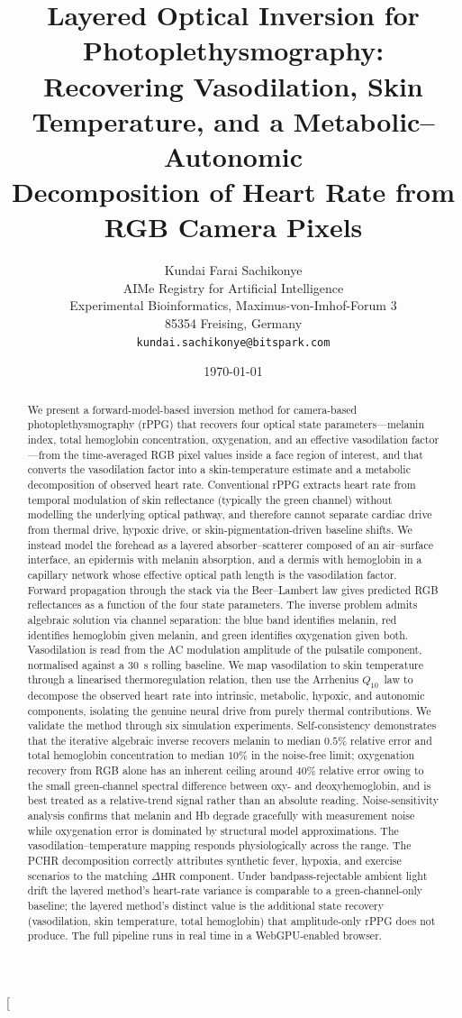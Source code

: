 \documentclass[10pt,twocolumn,a4paper]{article}
\title{\textbf{Layered Optical Inversion for Photoplethysmography:\\
Recovering Vasodilation, Skin Temperature, and a Metabolic--Autonomic\\
Decomposition of Heart Rate from RGB Camera Pixels}\\[0.3em]}
\author{
Kundai Farai Sachikonye\\[0.3em]
AIMe Registry for Artificial Intelligence\\
Experimental Bioinformatics, Maximus-von-Imhof-Forum 3\\
85354 Freising, Germany\\
\texttt{kundai.sachikonye@bitspark.com}
}
\date{\today}
\theoremstyle{definition}
\newcommand{\Qten}{Q_{10}}
\begin{document}
\twocolumn[
\begin{@twocolumnfalse}
\maketitle
\begin{abstract}
\noindent
We present a forward-model-based inversion method for camera-based
photoplethysmography (rPPG) that recovers four optical state
parameters---melanin index, total hemoglobin concentration, oxygenation,
and an effective vasodilation factor---from the time-averaged RGB pixel
values inside a face region of interest, and that converts the
vasodilation factor into a skin-temperature estimate and a metabolic
decomposition of observed heart rate. Conventional rPPG extracts
heart rate from temporal modulation of skin reflectance (typically the
green channel) without modelling the underlying optical pathway, and
therefore cannot separate cardiac drive from thermal drive, hypoxic
drive, or skin-pigmentation-driven baseline shifts. We instead model
the forehead as a layered absorber--scatterer composed of an
air--surface interface, an epidermis with melanin absorption, and a
dermis with hemoglobin in a capillary network whose effective optical
path length is the vasodilation factor. Forward propagation through
the stack via the Beer--Lambert law gives predicted RGB reflectances as
a function of the four state parameters. The inverse problem admits
algebraic solution via channel separation: the blue band identifies
melanin, red identifies hemoglobin given melanin, and green identifies
oxygenation given both. Vasodilation is read from the AC modulation
amplitude of the pulsatile component, normalised against a 30~s
rolling baseline. We map vasodilation to skin temperature through a
linearised thermoregulation relation, then use the Arrhenius
$\Qten$~law to decompose the observed heart rate into intrinsic,
metabolic, hypoxic, and autonomic components, isolating the genuine
neural drive from purely thermal contributions. We validate the method
through six simulation experiments. Self-consistency demonstrates
that the iterative algebraic inverse recovers melanin to median
$0.5\%$ relative error and total hemoglobin concentration to
median $10\%$ in the noise-free limit; oxygenation recovery from
RGB alone has an inherent ceiling around $40\%$ relative error owing
to the small green-channel spectral difference between oxy- and
deoxyhemoglobin, and is best treated as a relative-trend signal
rather than an absolute reading. Noise-sensitivity analysis confirms
that melanin and Hb degrade gracefully with measurement noise while
oxygenation error is dominated by structural model approximations.
The vasodilation--temperature mapping responds physiologically across
the range. The PCHR decomposition correctly attributes synthetic
fever, hypoxia, and exercise scenarios to the matching
$\Delta\mathrm{HR}$ component. Under bandpass-rejectable ambient
light drift the layered method's heart-rate variance is comparable
to a green-channel-only baseline; the layered method's distinct
value is the additional state recovery (vasodilation, skin
temperature, total hemoglobin) that amplitude-only rPPG does not
produce. The full pipeline runs in real time in a WebGPU-enabled
browser.


\end{abstract}
\end{@twocolumnfalse}
\end{document}
